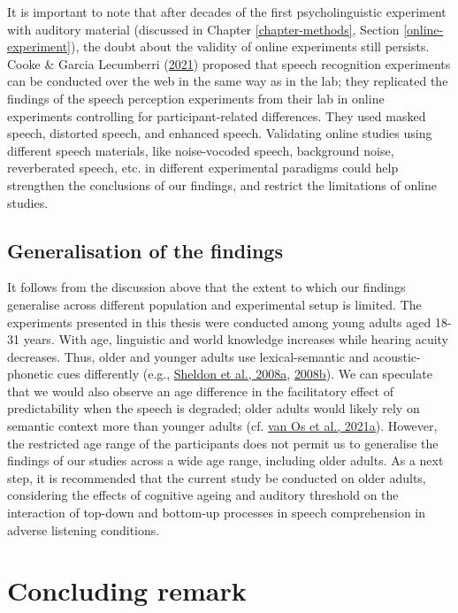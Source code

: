 \documentclass[a4paper, nobind]{templates/ociamthesis}
\begin{document}
It is important to note that after decades of the first psycholinguistic experiment with auditory material (discussed in Chapter \ref{chapter-methods}, Section \ref{online-experiment}),
the doubt about the validity of online experiments still persists.
Cooke \& Garcia Lecumberri (\protect\hyperlink{ref-Cooke2021}{2021}) proposed that speech recognition experiments can be conducted over the web in the same way as in the lab;
they replicated the findings of the speech perception experiments from their lab in online experiments controlling for participant-related differences.
They used masked speech, distorted speech, and enhanced speech.
Validating online studies using different speech materials, like noise-vocoded speech, background noise, reverberated speech, etc. in different experimental paradigms could help strengthen the conclusions of our findings,
and restrict the limitations of online studies.

\hypertarget{generalisation-of-the-findings}{%
\subsection{Generalisation of the findings}\label{generalisation-of-the-findings}}

It follows from the discussion above that the extent to which our findings generalise across different population and experimental setup is limited.
The experiments presented in this thesis were conducted among young adults aged 18-31 years.
With age, linguistic and world knowledge increases while hearing acuity decreases.
Thus, older and younger adults use lexical-semantic and acoustic-phonetic cues differently (e.g., \protect\hyperlink{ref-Sheldon2008a}{Sheldon et al., 2008a}, \protect\hyperlink{ref-Sheldon2008b}{2008b}).
We can speculate that we would also observe an age difference in the facilitatory effect of predictability when the speech is degraded;
older adults would likely rely on semantic context more than younger adults (cf. \protect\hyperlink{ref-vanOs2021a}{van Os et al., 2021a}).
However, the restricted age range of the participants does not permit us to generalise the findings of our studies across a wide age range, including older adults.
As a next step, it is recommended that the current study be conducted on older adults, considering the effects of cognitive ageing and auditory threshold
on the interaction of top-down and bottom-up processes in speech comprehension in adverse listening conditions.

\hypertarget{concluding-remark}{%
\section{Concluding remark}\label{concluding-remark}}
\end{document}
